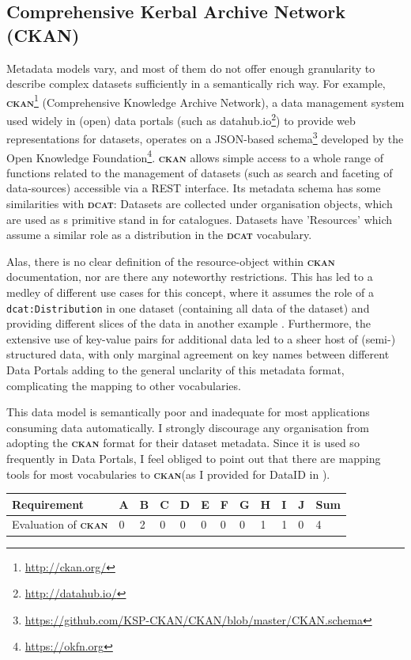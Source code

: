\documentclass[a4paper,english,twoside,BCOR1.5cm,headsepline,DIV12,appendixprefix,final,12pt]{scrbook}
\newcommand{\ckan}{{\scshape\bfseries ckan}\xspace}
\newcommand{\dcat}{{\scshape\bfseries dcat}\xspace}
\newcommand{\prop}[1]{{{\texttt{#1}}}}
\newcommand\footnoteurl[1]{\footnote{\scriptsize\url{#1}}}
\begin{document}
\subsection{Comprehensive Kerbal Archive Network (CKAN)}
\label{sec:ckan}

Metadata models vary, and most of them do not offer enough granularity to describe complex datasets sufficiently in a semantically rich way. 
For example, \ckan{}\footnoteurl{http://ckan.org/} (Comprehensive Knowledge Archive Network), a data management system used widely in (open) data portals (such as datahub.io\footnoteurl{http://datahub.io/}) to provide web representations for datasets, operates on a JSON-based schema\footnoteurl{https://github.com/KSP-CKAN/CKAN/blob/master/CKAN.schema} developed by the Open Knowledge Foundation\footnoteurl{https://okfn.org}.
\ckan allows simple access to a whole range of functions related to the management of datasets (such as search and faceting of data-sources) accessible via a REST interface.
Its metadata schema has some similarities with \dcat: Datasets are collected under organisation objects, which are used as s primitive stand in for catalogues. Datasets have 'Resources' which assume a similar role as a distribution in the \dcat vocabulary. 

Alas, there is no clear definition of the resource-object within \ckan documentation, nor are there any noteworthy restrictions. This has led to a medley of different use cases for this concept, where it assumes the role of a \prop{dcat:Distribution} in one dataset (containing all data of the dataset) and providing different slices of the data in another example \cite{neum-etal-2016w3c}. Furthermore, the extensive use of key-value pairs for additional data led to a sheer host of (semi-) structured data, with only marginal agreement on key names between different Data Portals \cite{neum-etal-2016w3c} adding to the general unclarity of this metadata format, complicating the mapping to other vocabularies.

This data model is semantically poor and inadequate for most applications consuming data automatically. I strongly discourage any organisation from adopting the \ckan format for their dataset metadata. Since it is used so frequently in Data Portals, I feel obliged to point out that there are mapping tools for most vocabularies to \ckan (as I provided for DataID in \cite{dataID2014}).

\begin{table}[!htbp]
    \centering
    \begin{tabular}{|l|l|l|l|l|l|l|l|l|l|l|l|}
        \hline
        Requirement & A & B & C & D & E & F & G & H & I & J & Sum \\
        \hline
        Evaluation of \ckan & 0 & 2 & 0 & 0 & 0 & 0 & 0 & 1 & 1 & 0 & 4 \\
        \hline
    \end{tabular}
    \label{tab:evalckan}
\end{table}
\end{document}
